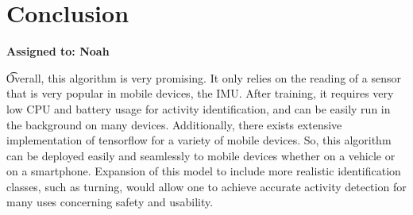 \documentclass{article}
\begin{document}
\section{Conclusion}
\vspace{-.3cm}
\textbf{Assigned to: Noah}

\t Overall, this algorithm is very promising. It only relies on the reading of a sensor that is very popular in mobile devices, the IMU. After training, it requires very low CPU and battery usage for activity identification, and can be easily run in the background on many devices. Additionally, there exists extensive implementation of tensorflow for a variety of mobile devices. So, this algorithm can be deployed easily and seamlessly to mobile devices whether on a vehicle or on a smartphone. Expansion of this model to include more realistic identification classes, such as turning, would allow one to achieve accurate activity detection for many uses concerning safety and usability.  
\end{document}
